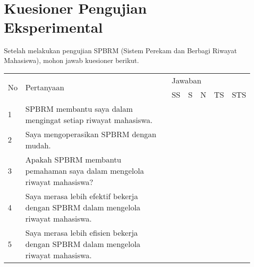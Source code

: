 \chapter{Kuesioner Pengujian Eksperimental}
\label{kuesionerpengujianeksperimental}

Setelah melakukan pengujian SPBRM (Sistem Perekam dan Berbagi Riwayat Mahasiswa), mohon jawab kuesioner berikut.

\begin{table}[h]
\centering
\begin{tabular}{|l|p{10cm}|l|l|l|l|l|}
\hline
\multirow{2}{*}{No} & \multirow{2}{*}{Pertanyaan}                                                       & \multicolumn{5}{l|}{Jawaban} \\ \cline{3-7} 
                    &                                                                                   & SS   & S   & N  & TS  & STS  \\ \hline
1                   & SPBRM membantu saya dalam mengingat setiap riwayat mahasiswa.                     &      &     &    &     &      \\ \hline
2                   & Saya mengoperasikan SPBRM dengan mudah.                                           &      &     &    &     &      \\ \hline
3                   & Apakah SPBRM membantu pemahaman saya dalam mengelola riwayat mahasiswa?           &      &     &    &     &      \\ \hline
4                   & Saya merasa lebih efektif bekerja dengan SPBRM dalam mengelola riwayat mahasiswa. &      &     &    &     &      \\ \hline
5                   & Saya merasa lebih efisien bekerja dengan SPBRM dalam mengelola riwayat mahasiswa. &      &     &    &     &      \\ \hline
\end{tabular}
\end{table}